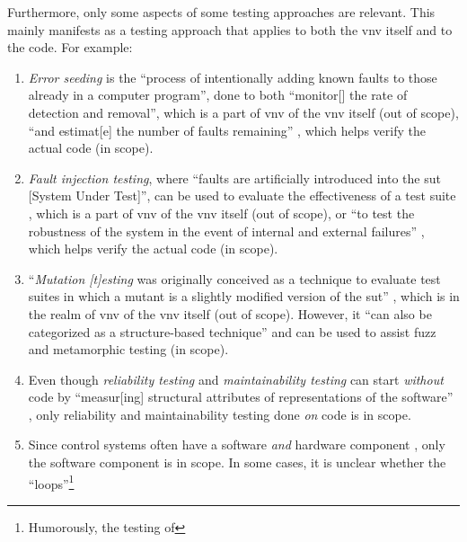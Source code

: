 Furthermore, only some aspects of some testing approaches are relevant. This
mainly manifests as a testing approach that applies to both the \acs{vnv} itself
and to the code. For example:

\begin{enumerate}
      \item \emph{Error seeding} is the ``process of intentionally adding
            known faults to those already in a computer program'',
            done to both ``monitor[] the rate of detection and removal'',
            which is a part of \acs{vnv} of the \acs{vnv} itself (out of scope),
            ``and estimat[e] the number of faults remaining''
            \citep[p.~165]{IEEE2017}, which helps verify the actual code (in scope).
      \item \emph{Fault injection testing}, where ``faults are artificially
            introduced into the \acs{sut} [System Under Test]'', can be used to
            evaluate the effectiveness of a test suite \citep[p.~5-18]{SWEBOK2024},
            which is a part of \acs{vnv} of the \acs{vnv} itself (out of scope),
            or ``to test
            the robustness of the system in the event of internal and
            external failures'' \citep[p.~42]{IEEE2022}, which helps verify
            the actual code (in scope).
      \item ``\emph{Mutation [t]esting} was originally conceived as a
            technique to evaluate test suites in which a mutant is a slightly
            modified version of the \acs{sut}'' \citep[p.~5-15]{SWEBOK2024},
            which is in the realm of \acs{vnv} of the \acs{vnv} itself (out of
            scope). However, it ``can also be categorized as a structure-based
            technique'' and can be used to assist fuzz and metamorphic testing
            \citep[p.~5-15]{SWEBOK2024} (in scope).
            \ifnotpaper
      \item Even though \emph{reliability testing} and \emph{maintainability
                  testing} can start \emph{without} code by ``measur[ing]
            structural attributes of representations of the software''
            \citep[p.~18]{FentonAndPfleeger1997}, only reliability and
            maintainability testing done \emph{on} code is in scope.
      \item Since control systems often have a software \emph{and} hardware
            component \citep{ISO2015, PreußeEtAl2012,ForsythEtAl2004},
            only the software component is in scope. In some cases, it is
            unclear whether the ``loops''\footnote{Humorously, the testing of
}
\end{enumerate}
